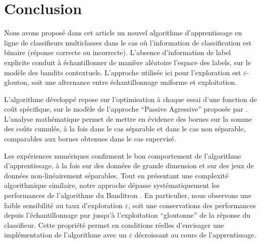 \documentclass[twocolumn]{article}
\begin{document}







\section{Conclusion}
\label{sec:conclusion}

Nous avons proposé dans cet article un nouvel algorithme d'apprentissage en ligne de classifieurs multiclasses dans le cas où l'information de classification est binaire (réponse correcte ou incorrecte). L'absence d'information de label explicite conduit à échantillonner de manière aléatoire l'espace des labels, sur le modèle des bandits contextuels. L'approche utilisée ici pour l'exploration est $\varepsilon$-glouton, soit une alternance entre échantillonnage uniforme et exploitation. 

L'algorithme développé repose  sur l'optimisation à chaque essai d'une fonction de coût spécifique, sur le modèle de l'approche ``Passive Agressive'' proposée par \cite{crammer2006online}. 
L'analyse mathématique permet de mettre en évidence des bornes sur la somme des coûts cumulés, à la fois dans le cas séparable et dans le cas non séparable, comparables aux bornes obtenues dans le cas supervisé.

Les expériences numériques confirment le bon comportement de l'algorithme d'apprentissage, à la fois sur des données de grande dimension et sur des jeux de données non-linéairement séparables. Tout en présentant une complexité algorithmique similaire, notre approche dépasse systématiquement les performances de l'algorithme du Banditron \cite{kakade2008efficient}. En particulier, nous observons une faible sensibilité au taux d'exploration $\varepsilon$, soit une conservations des performances depuis l'échantillonnage pur jusqu'à l'exploitation ``gloutonne'' de la réponse du classifieur. Cette propriété permet en conditions réelles d'envisager une implémentation de l'algorithme avec un $\varepsilon$ décroissant au cours de l'apprentissage.    
\end{document}
